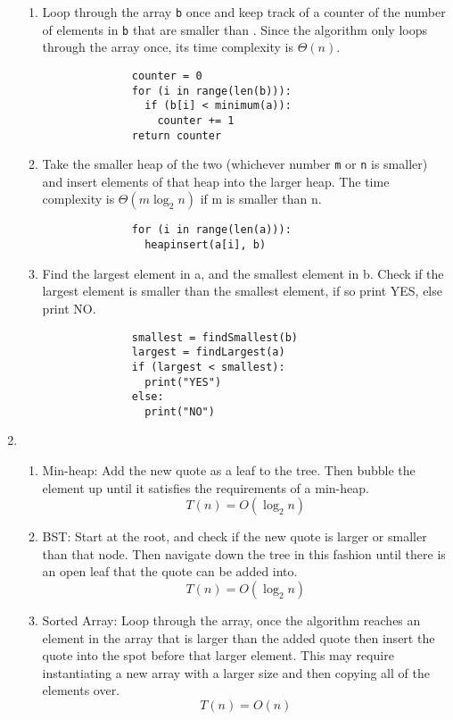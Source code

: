 \documentclass[11pt, letterpaper]{article}
\begin{document}
\begin{enumerate}
\begin{enumerate}
          \item
            Loop through the array \texttt{b} once and keep track of a counter of the number of elements in \texttt{b} that are smaller
            than . Since the algorithm only loops through the array once, its time complexity is $\Theta (n)$.

            \begin{lstlisting}
              counter = 0
              for (i in range(len(b))):
                if (b[i] < minimum(a)):
                  counter += 1
              return counter
            \end{lstlisting}

          \item
            Take the smaller heap of the two (whichever number \texttt{m} or \texttt{n} is smaller) and insert elements of that
            heap into the larger heap. The time complexity is $\Theta (m\log _{2}n)$ if m is smaller than n.

            \begin{lstlisting}
              for (i in range(len(a))):
                heapinsert(a[i], b)
            \end{lstlisting}

          \item
            Find the largest element in a, and the smallest element in b. Check if the largest element is smaller than the smallest
            element, if so print YES, else print NO.

            \begin{lstlisting}
              smallest = findSmallest(b)
              largest = findLargest(a)
              if (largest < smallest):
                print("YES")
              else:
                print("NO")
            \end{lstlisting}
      \end{enumerate}

    \item
      \begin{enumerate}
        \item
          Min-heap: Add the new quote as a leaf to the tree. Then bubble the element up until it satisfies the requirements of a
          min-heap.
          \[ T(n) = O(\log _{2}n) \]
        \item
          BST: Start at the root, and check if the new quote is larger or smaller than that node. Then navigate down the tree in
          this fashion until there is an open leaf that the quote can be added into.
          \[ T(n) = O(\log _{2}n) \]
        \item
          Sorted Array: Loop through the array, once the algorithm reaches an element in the array that is larger than the added quote
          then insert the quote into the spot before that larger element. This may require instantiating a new array with a larger size
          and then copying all of the elements over.
          \[ T(n) = O(n) \]
      \end{enumerate}
  \end{enumerate}
\end{document}
